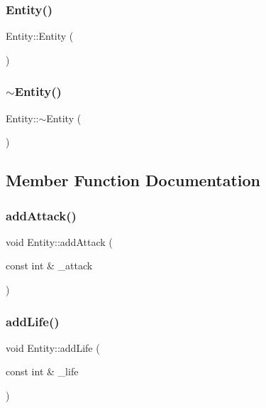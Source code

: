 \subsubsection{\texorpdfstring{Entity()}{Entity()}\hspace{0.1cm}{\footnotesize\ttfamily [2/2]}}
{\footnotesize\ttfamily Entity\+::\+Entity (\begin{DoxyParamCaption}{ }\end{DoxyParamCaption})}

\mbox{\label{class_entity_adf6d3f7cb1b2ba029b6b048a395cc8ae}} 
\subsubsection{\texorpdfstring{$\sim$\+Entity()}{~Entity()}}
{\footnotesize\ttfamily Entity\+::$\sim$\+Entity (\begin{DoxyParamCaption}{ }\end{DoxyParamCaption})}



\subsection{Member Function Documentation}
\mbox{\label{class_entity_a4c5215758a9cda8418823d4d878315c6}} 
\subsubsection{\texorpdfstring{add\+Attack()}{addAttack()}}
{\footnotesize\ttfamily void Entity\+::add\+Attack (\begin{DoxyParamCaption}\item[{const int \&}]{\+\_\+attack }\end{DoxyParamCaption})\hspace{0.3cm}{\ttfamily [inline]}}

\mbox{\label{class_entity_ad7ede2df84a14540f70acc4688b2d239}} 
\subsubsection{\texorpdfstring{add\+Life()}{addLife()}}
{\footnotesize\ttfamily void Entity\+::add\+Life (\begin{DoxyParamCaption}\item[{const int \&}]{\+\_\+life }\end{DoxyParamCaption})\hspace{0.3cm}{\ttfamily [inline]}}

